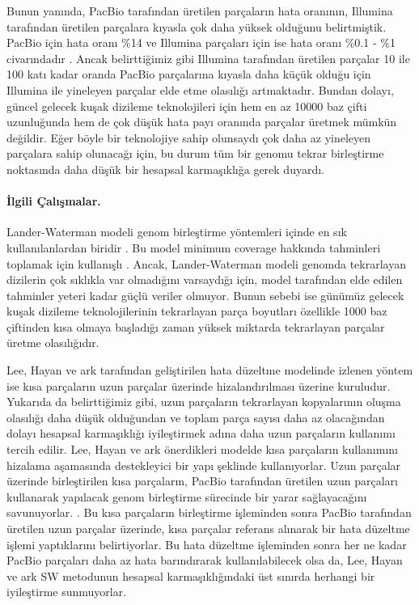 Bunun yanında, PacBio tarafından üretilen parçaların hata oranının, Illumina tarafından üretilen parçalara kıyasla çok daha yüksek olduğunu belirtmiştik. PacBio için hata oranı \%14 \cite{pacbioerr} ve Illumina parçaları için ise hata oranı \%0.1 - \%1 civarındadır \cite{Lou2013}. Ancak belirttiğimiz gibi Illumina tarafından üretilen parçalar 10 ile 100 katı kadar oranda PacBio parçalarına kıyasla daha küçük olduğu için Illumina ile yineleyen parçalar elde etme olasılığı artmaktadır. Bundan dolayı, güncel gelecek kuşak dizileme teknolojileri için hem en az 10000 baz çifti uzunluğunda hem de çok düşük hata payı oranında parçalar üretmek mümkün değildir. Eğer böyle bir teknolojiye sahip olunsaydı çok daha az yineleyen parçalara sahip olunacağı için, bu durum tüm bir genomu tekrar birleştirme noktasında daha düşük bir hesapsal karmaşıklığa gerek duyardı. 

\paragraph{İlgili Çalışmalar.}

Lander-Waterman modeli genom birleştirme yöntemleri içinde en sık kullanılanlardan biridir \cite{Lander1988}. Bu model minimum coverage hakkında tahminleri toplamak için kullanışlı \cite{Lee2014}. Ancak, Lander-Waterman modeli genomda tekrarlayan dizilerin çok sıklıkla var olmadığını varsaydığı için, model tarafından elde edilen tahminler yeteri kadar güçlü veriler olmuyor. Bunun sebebi ise günümüz gelecek kuşak dizileme teknolojilerinin tekrarlayan parça boyutları özellikle 1000 baz çiftinden kısa olmaya başladığı zaman yüksek miktarda tekrarlayan parçalar üretme olasılığıdır.

Lee, Hayan ve ark \cite{Lee2014} tarafından geliştirilen hata düzeltme modelinde izlenen yöntem ise kısa parçaların uzun parçalar üzerinde hizalandırılması üzerine kuruludur. Yukarıda da belirttiğimiz gibi, uzun parçaların tekrarlayan kopyalarının oluşma olasılığı daha düşük olduğundan ve toplam parça sayısı daha az olacağından dolayı hesapsal karmaşıklığı iyileştirmek adına daha uzun parçaların kullanımı tercih edilir. Lee, Hayan ve ark önerdikleri modelde kısa parçaların kullanımını hizalama aşamasında destekleyici bir yapı şeklinde kullanıyorlar. Uzun parçalar üzerinde birleştirilen kısa parçaların, PacBio tarafından üretilen uzun parçaları kullanarak yapılacak genom birleştirme sürecinde bir yarar sağlayacağını savunuyorlar. \cite{Lee2014}. Bu kısa parçaların birleştirme işleminden sonra PacBio tarafından üretilen uzun parçalar üzerinde, kısa parçalar referans alınarak bir hata düzeltme işlemi yaptıklarını belirtiyorlar. Bu hata düzeltme işleminden sonra her ne kadar PacBio parçaları daha az hata barındırarak kullanılabilecek olsa da, Lee, Hayan ve ark SW metodunun hesapsal karmaşıklığındaki üst sınırda herhangi bir iyileştirme sunmuyorlar.

